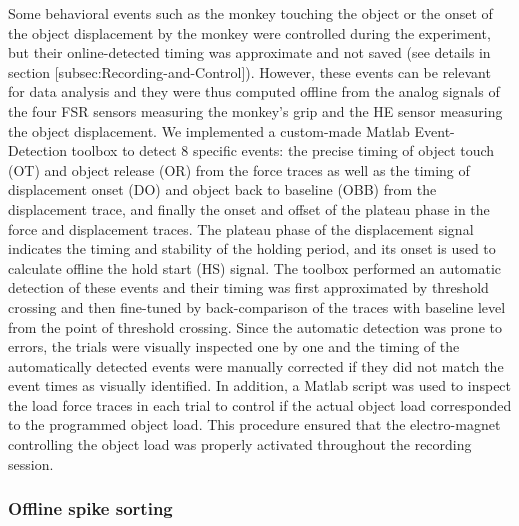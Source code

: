 Some behavioral events such as the monkey touching the object or the onset of the object displacement by the monkey were controlled during the experiment, but their online-detected timing was approximate and not saved (see details in section [subsec:Recording-and-Control]). However, these events can be relevant for data analysis and they were thus computed offline from the analog signals of the four FSR sensors measuring the monkey's grip and the HE sensor measuring the object displacement. We implemented a custom-made Matlab Event-Detection toolbox to detect 8 specific events: the precise timing of object touch (OT) and object release (OR) from the force traces as well as the timing of displacement onset (DO) and object back to baseline (OBB) from the displacement trace, and finally the onset and offset of the plateau phase in the force and displacement traces. The plateau phase of the displacement signal indicates the timing and stability of the holding period, and its onset is used to calculate offline the hold start (HS) signal. The toolbox performed an automatic detection of these events and their timing was first approximated by threshold crossing and then fine-tuned by back-comparison of the traces with baseline level from the point of threshold crossing. Since the automatic detection was prone to errors, the trials were visually inspected one by one and the timing of the automatically detected events were manually corrected if they did not match the event times as visually identified. In addition, a Matlab script was used to inspect the load force traces in each trial to control if the actual object load corresponded to the programmed object load. This procedure ensured that the electro-magnet controlling the object load was properly activated throughout the recording session. 

\subsubsection{Offline spike sorting}

